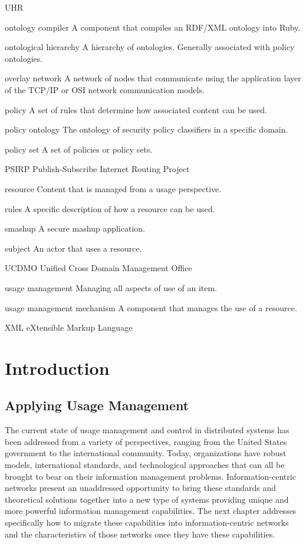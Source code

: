 \documentclass[botnum,fleqn,final]{unmeethesis}
\begin{document}
\begin{glossary}{UHR}
\item[ontology compiler] A component that compiles an RDF/XML ontology into Ruby.
\item[ontological hierarchy] A hierarchy of ontologies.  Generally associated with policy ontologies.
\item[overlay network] A network of nodes that communicate using the application layer of the TCP/IP or OSI network communication models.
\item[policy] A set of rules that determine how associated content can be used.
\item[policy ontology] The ontology of security policy classifiers in a specific domain.
\item[policy set] A set of policies or policy sets.
\item[PSIRP] Publish-Subscribe Internet Routing Project
\item[resource] Content that is managed from a usage perspective.
\item[rules] A specific description of how a resource can be used.
\item[smashup] A secure mashup application.
\item[subject] An actor that uses a resource.
\item[UCDMO] Unified Cross Domain Management Office
\item[usage management] Managing all aspects of use of an item.
\item[usage management mechanism] A component that manages the use of a resource.
\item[XML] eXtensible Markup Language
\end{glossary}

\mainmatter

\chapter{Introduction}







\section{Applying Usage Management}
The current state of usage management and control in distributed systems has been addressed from a variety of perspectives, ranging from the United States government to the international community.  Today, organizations have robust models, international standards, and technological approaches that can all be brought to bear on their information management problems.  Information-centric networks present an unaddressed opportunity to bring these standards and theoretical solutions together into a new type of systems providing unique and more powerful information management capabilities.  The next chapter addresses specifically how to migrate these capabilities into information-centric networks and the characteristics of those networks once they have these capabilities.
\end{document}
